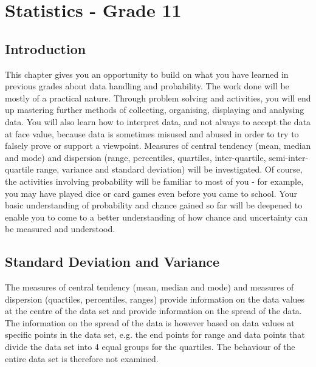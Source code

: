 \chapter{Statistics - Grade 11}
\label{m:s11}

\section{Introduction}
This chapter gives you an opportunity to build on what you have learned in previous grades about data handling and probability. The work done will be mostly  of a practical nature. Through problem solving and activities, you will end up mastering further methods of collecting, organising, displaying and analysing data. You will also learn how to interpret data, and not always to accept the data at face value, because data is sometimes misused and abused in order to try to falsely prove or support a viewpoint. Measures of central tendency (mean, median and mode) and dispersion (range, percentiles, quartiles, inter-quartile, semi-inter-quartile range, variance and standard deviation) will be investigated. Of course, the activities involving probability will be familiar to most of you - for example, you may have played dice or card games even before you came to school. Your basic understanding of probability and chance gained so far will be deepened to enable you to come to a better understanding of how chance and uncertainty can be measured and understood.  

\section{Standard Deviation and Variance}

The measures of central tendency (mean, median and mode) and measures of dispersion (quartiles, percentiles, ranges) provide information on the data values at the centre of the data set and provide information on the spread of the data. The information on the spread of the data is however based on data values at specific points in the data set, e.g. the end points for range and data points that divide the data set into 4 equal groups for the quartiles. The behaviour of the entire data set is therefore not examined.

